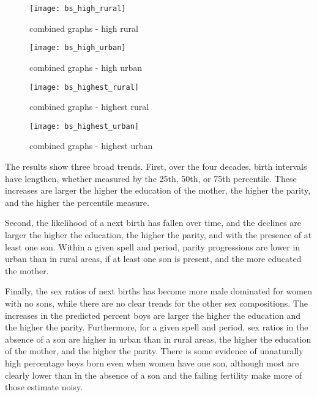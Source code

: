 \documentclass[12pt,letterpaper]{article}
\begin{document}
\begin{figure}
\centering
\texttt{[image: bs\_high\_rural]}
\caption{combined graphs - high rural}
\label{fig:spacing_high_rural}
\end{figure}

\begin{figure}
\centering
\texttt{[image: bs\_high\_urban]}
\caption{combined graphs - high urban}
\label{fig:spacing_high_urban}
\end{figure}

\begin{figure}
\centering
\texttt{[image: bs\_highest\_rural]}
\caption{combined graphs - highest rural}
\label{fig:spacing_highest_rural}
\end{figure}

\begin{figure}
\centering
\texttt{[image: bs\_highest\_urban]}
\caption{combined graphs - highest urban}
\label{fig:spacing_highest_urban}
\end{figure}

The results show three broad trends.
First, 
over the four decades, birth intervals have lengthen, whether measured by the
25th, 50th, or 75th percentile.
These increases are larger the higher the education of the mother, the higher the parity, 
and the higher the percentile measure.


Second, 
the likelihood of a next birth has fallen over time, and the declines are
larger the higher the education, the higher the parity, and with the presence of at
least one son. 
Within a given spell and period, parity progressions are lower in urban than in rural areas, 
if at least one son is present, and the more educated the mother.


Finally, 
the sex ratios of next births has become more male dominated for women with no
sons, while there are no clear trends for the other sex compositions.
The increases in the predicted percent boys are larger the higher the education and the 
higher the parity.
Furthermore, for a given spell and period, sex ratios in the absence of a son are higher 
in urban than in rural areas, the higher the education of the mother, and the higher
the parity.
There is some evidence of unnaturally high percentage boys born even when women have one 
son, although most are clearly lower than in the absence of a son and the failing fertility
make more of those estimate noisy.
\end{document}
